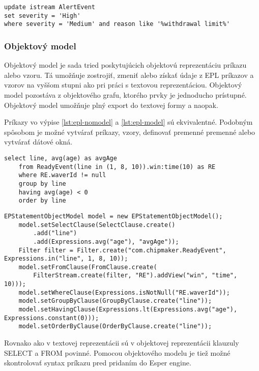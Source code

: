 		\begin{lstlisting}[label=lst:update,caption=Príklady úpravy udalosti pred spracovaním \cite{web:esper-doc}]
update istream AlertEvent 
set severity = 'High'
where severity = 'Medium' and reason like '%withdrawal limit%'		
		\end{lstlisting}
		
		\subsubsection{Objektový model}	
		Objektový model je sada tried poskytujúcich objektovú reprezentáciu príkazu alebo vzoru. Tá umožňuje zostrojiť, zmeniť alebo získať údaje z EPL príkazov a vzorov na vyššom stupni ako pri práci s textovou reprezentáciou. Objektový model pozostáva z objektového grafu, ktorého prvky je jednoducho prístupné. Objektový model umožňuje plný export do textovej formy a naopak.
		
		Príkazy vo výpise \ref{lst:epl-nomodel} a \ref{lst:epl-model} sú ekvivalentné. Podobným spôsobom je možné vytvárať príkazy, vzory, definovať premenné premenné alebo vytvárať dátové okná.
		
		\begin{lstlisting}[label=lst:epl-nomodel,caption=EPL príkaz bez použitia objektového modelu \cite{web:esper-doc}]
	select line, avg(age) as avgAge 
	from ReadyEvent(line in (1, 8, 10)).win:time(10) as RE
	where RE.waverId != null
	group by line 
	having avg(age) < 0
	order by line
		\end{lstlisting}
		
		\begin{lstlisting}[label=lst:epl-model,caption=EPL príkaz s použitím objektového modelu \cite{web:esper-doc}]
	EPStatementObjectModel model = new EPStatementObjectModel();
	model.setSelectClause(SelectClause.create()
		.add("line")
		.add(Expressions.avg("age"), "avgAge"));
	Filter filter = Filter.create("com.chipmaker.ReadyEvent", Expressions.in("line", 1, 8, 10));
	model.setFromClause(FromClause.create(
		FilterStream.create(filter, "RE").addView("win", "time", 10)));
	model.setWhereClause(Expressions.isNotNull("RE.waverId"));
	model.setGroupByClause(GroupByClause.create("line"));
	model.setHavingClause(Expressions.lt(Expressions.avg("age"), Expressions.constant(0)));
	model.setOrderByClause(OrderByClause.create("line"));
		\end{lstlisting}
	
		Rovnako ako v textovej reprezentácii sú v objektovej reprezentácii klauzuly SELECT a FROM povinné. Pomocou objektového modelu je tiež možné skontrolovať syntax príkazu pred pridaním do Esper engine.

